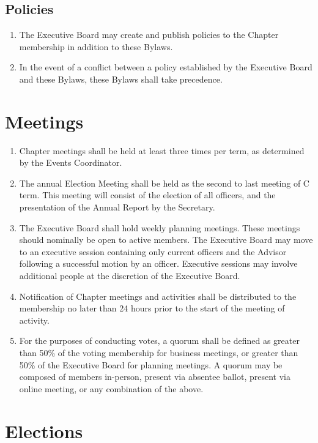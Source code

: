 \documentclass[12pt, letterpaper, oneside]{book}
\begin{document}
\section{Policies}
\label{sec:policies}
\begin{enumerate}
    \item The Executive Board may create and publish policies to the Chapter
        membership in addition to these Bylaws.
    \item In the event of a conflict between a policy established by the
        Executive Board and these Bylaws, these Bylaws shall take precedence.
\end{enumerate}

\chapter{Meetings}
\begin{enumerate}
    \item Chapter meetings shall be held at least three times per term, as
        determined by the Events Coordinator.
    \item The annual Election Meeting shall be held as the second to last
        meeting of C term. This meeting will consist of the election of all
        officers, and the presentation of the Annual Report by the Secretary.
    \item The Executive Board shall hold weekly planning meetings. These
        meetings should nominally be open to active members.
        \subitem The Executive Board may move to an executive session containing
        only current officers and the Advisor following a successful motion by
        an officer. Executive sessions may involve additional people at the
        discretion of the Executive Board.
    \item Notification of Chapter meetings and activities shall be distributed
        to the membership no later than 24 hours prior to the start of the
        meeting of activity.
    \item For the purposes of conducting votes, a quorum shall be defined as
        greater than 50\% of the voting membership for business meetings, or
        greater than 50\% of the Executive Board for planning meetings. A quorum
        may be composed of members in-person, present via absentee ballot,
        present via online meeting, or any combination of the above.
\end{enumerate}

\chapter{Elections}
\end{document}
